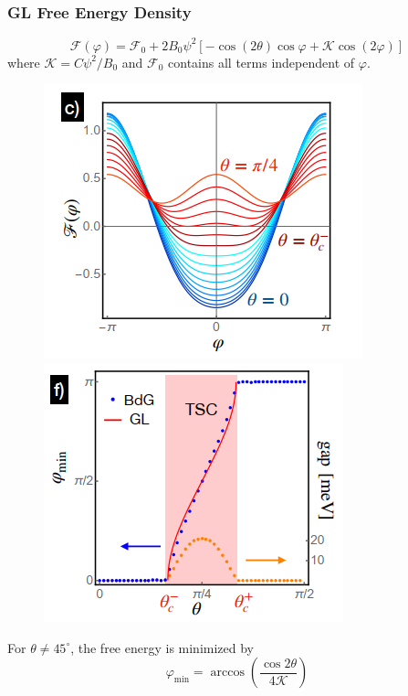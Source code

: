 \documentclass{beamer}
\begin{document}
\begin{frame}
\frametitle{GL Free Energy Density}
\begin{equation}
\mathcal{F}(\varphi)=\mathcal{F}_0+2B_0\psi^2\left[-\cos(2\theta)\cos\varphi+\mathcal{K}\cos(2\varphi)\right]
\end{equation}
where $\mathcal{K}=C\psi^2/B_0$ and $\mathcal{F}_0$ contains all terms independent of $\varphi$.
\begin{figure}
\centering
\includegraphics[scale=0.5]{pic/p5.png}
\includegraphics[scale=0.5]{pic/p6.png}
\end{figure}
For $\theta\neq 45^\circ$, the free energy is minimized by
\begin{equation}
\varphi_{\textrm{min}}=\arccos(\frac{\cos 2\theta}{4\mathcal{K}})
\end{equation}
\end{frame}
\end{document}
